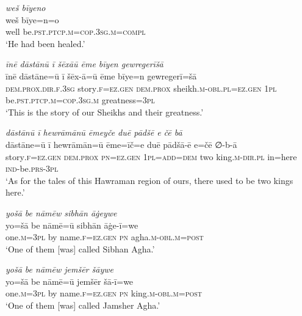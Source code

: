 \ea \label{DG.71}
\textit{weš bīyeno} \\ 
\gll weš bīye=n=o \\ 
 well be\textsc{.pst}\textsc{.ptcp}\textsc{.m}\textsc{=cop}\textsc{.3sg}\textsc{.m}\textsc{=compl} \\ 
\glt `He had been healed.'
\z 
 
\ea \label{DG.73}
\textit{īnē dāstānū ī šēxāū ēme bīyen gewregerīšā} \\ 
\gll īnē dāstāne=ū ī šēx-ā=ū ēme bīye=n gewregerī=šā \\ 
 \textsc{dem.prox}\textsc{.dir}\textsc{\textsc{.f}}\textsc{.3sg} story\textsc{\textsc{.f}}\textsc{=ez}\textsc{.gen} \textsc{dem.prox} sheikh\textsc{.m}\textsc{-obl}\textsc{.pl}=\textsc{ez.gen} \textsc{1pl} be\textsc{.pst}\textsc{.ptcp}\textsc{.m}\textsc{=cop}\textsc{.3sg}\textsc{.m} greatness\textsc{=3pl} \\ 
\glt `This is the story of our Sheikhs and their greatness.'
\z 
 

\ea \label{DP.1}
\textit{dāstānū ī hewrāmānū ēmeyče duē pādšē e čē bā} \\ 
\gll dāstāne=ū ī hewrāmān=ū ēme=īč=e duē pādšā-ē e=čē ∅-b-ā \\ 
 story\textsc{\textsc{.f}}\textsc{=ez}\textsc{.gen} \textsc{dem.prox} \textsc{pn}\textsc{=ez}\textsc{.gen} \textsc{1pl}\textsc{=add}\textsc{=dem} two king\textsc{.m}\textsc{-dir}\textsc{.pl} in=here \textsc{ind-}be\textsc{.prs}\textsc{-3pl} \\ 
\glt `As for the tales of this Hawraman region of ours, there used to be two kings here.'
\z 
 
\ea \label{DP.2}
\textit{yošā be nāmēw sibhān āġeywe} \\ 
\gll yo=šā be nāmē=ū sibhān āġe-ī=we \\ 
 one\textsc{.m}\textsc{=3pl} by name\textsc{\textsc{.f}}\textsc{=ez}\textsc{.gen} \textsc{pn} agha\textsc{.m}\textsc{-obl}\textsc{.m}\textsc{=\textsc{post}} \\ 
\glt `One of them [was] called Sibhan Agha.'
\z 
 
\ea \label{DP.3}
\textit{yošā be nāmēw jemšēr šāywe} \\ 
\gll yo=šā be nāmē=ū jemšēr šā-ī=we \\ 
 one\textsc{.m}\textsc{=3pl} by name\textsc{\textsc{.f}}\textsc{=ez}\textsc{.gen} \textsc{pn} king\textsc{.m}\textsc{-obl}\textsc{.m}\textsc{=\textsc{post}} \\ 
\glt `One of them [was] called Jamsher Agha.'
\z 
 
